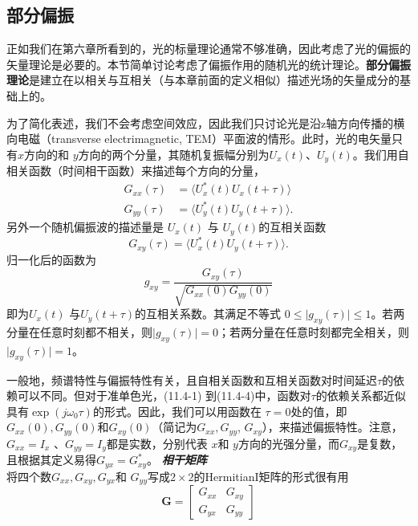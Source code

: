 \documentclass[UTF8]{ctexart}
\numberwithin{figure}{subsection}
\numberwithin{table}{subsection}
\begin{document}
\bigbreak\begingroup
\color{ksc}
\subsection{部分偏振}
\endgroup
正如我们在第六章所看到的，光的标量理论通常不够准确，因此考虑了光的偏振的矢量理论是必要的。本节简单讨论考虑了偏振作用的随机光的统计理论。\textbf{部分偏振理论}是建立在以相关与互相关（与本章前面的定义相似）描述光场的矢量成分的基础上的。
\par 为了简化表述，我们不会考虑空间效应，因此我们只讨论光是沿z轴方向传播的横向电磁（transverse electrimagnetic, TEM）平面波的情形。此时，光的电矢量只有$x$方向的和 $y$方向的两个分量，其随机复振幅分别为$U_x (t)$、$U_y (t)$。我们用自相关函数（时间相干函数）来描述每个方向的分量，
\begin{align}
G_{xx}(\tau) &= \langle U_x^\ast (t) U_x(t + \tau) \rangle \\
G_{yy}(\tau) &= \langle U_y^\ast (t) U_y(t + \tau) \rangle .
\end{align}
另外一个随机偏振波的描述量是 $U_x (t)$ 与 $U_y (t)$的互相关函数
\begin{equation}
G_{xy}(\tau) = \langle U_x^\ast (t) U_y(t + \tau) \rangle .
\end{equation}
归一化后的函数为
\begin{equation}
g_{xy} = \frac{G_{xy}(\tau)}{\sqrt{G_{xx}(0)G_{yy}(0)}}
\end{equation}
即为$U_x (t)$ 与$U_y(t + \tau)$的互相关系数。其满足不等式 $0 \le \vert g_{xy}(\tau) \rvert \le 1$。若两分量在任意时刻都不相关，则$\lvert g_{xy}(\tau) \rvert = 0$；若两分量在任意时刻都完全相关，则$\lvert g_{xy}(\tau) \rvert = 1$。
\par 一般地，频谱特性与偏振特性有关，且自相关函数和互相关函数对时间延迟$\tau$的依赖可以不同。但对于准单色光，(11.4-1) 到(11.4-4)中，函数对$\tau$的依赖关系都近似具有$\exp (j\omega_0 \tau)$的形式。因此，我们可以用函数在 $\tau = 0$处的值，即$G_{xx}(0), G_{yy}(0)$和$G_{xy}(0)$（简记为$G_{xx}, G_{yy}$, $G_{xy}$），来描述偏振特性。注意，$G_{xx} = I_x$ 、$G_{yy} = I_y$都是实数，分别代表 $x$和 $y$方向的光强分量，而$G_{xy}$是复数，且根据其定义易得$G_{yx} = G_{xy}^\ast$。
\bigbreak\noindent\textcolor{ksc}{\textbf{\textsl{相干矩阵}}}\\
将四个数$G_{xx}, G_{xy}, G_{yx}$和 $G_{yy}$写成$2 \times 2$的HermitianI矩阵的形式很有用
\begin{equation}
\mathbf{G} = 
\begin{bmatrix}
G_{xx} & G_{xy} \\
G_{yx} & G_{yy}
\end{bmatrix}
\end{equation}
\end{document}
